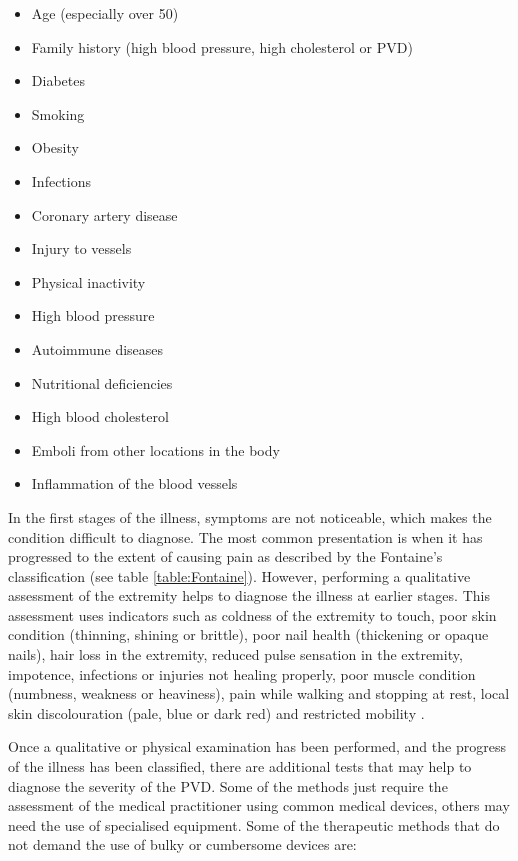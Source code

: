 \begin{itemize}[noitemsep]
    \item Age (especially over \num{50})
    \item Family history (high blood pressure, high cholesterol or PVD)
    \item Diabetes
    \item Smoking
    \item Obesity
    \item Infections
    \item Coronary artery disease
    \item Injury to vessels
    \item Physical inactivity
    \item High blood pressure
    \item Autoimmune diseases
    \item Nutritional deficiencies
    \item High blood cholesterol
    \item Emboli from other locations in the body
    \item Inflammation of the blood vessels
\end{itemize}

In the first stages of the illness, symptoms are not noticeable, which makes the condition difficult to diagnose. The most common presentation is when it has progressed to the extent of causing pain as described by the Fontaine's classification (see table \ref{table:Fontaine}). However, performing a qualitative assessment of the extremity helps to diagnose the illness at earlier stages. This assessment uses indicators such as coldness of the extremity to touch, poor skin condition (thinning, shining or brittle), poor nail health (thickening or opaque nails), hair loss in the extremity, reduced pulse sensation in the extremity, impotence, infections or injuries not healing properly, poor muscle condition (numbness, weakness or heaviness), pain while walking and stopping at rest, local skin discolouration (pale, blue or dark red) and restricted mobility \cite{morgan2001developing, norgren2007inter}.

Once a qualitative or physical examination has been performed, and the progress of the illness has been classified, there are additional tests that may help to diagnose the severity of the PVD. Some of the methods just require the assessment of the medical practitioner using common medical devices, others may need the use of specialised equipment. Some of the therapeutic methods that do not demand the use of bulky or cumbersome devices are:

